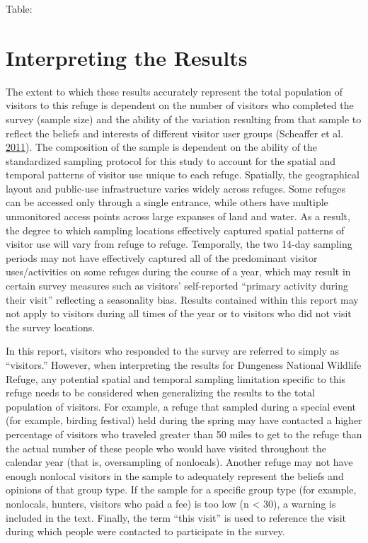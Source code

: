 \documentclass[]{book}
\begin{document}
Table: \label{tab:sampling-dates}

\section{Interpreting the Results}\label{interpreting-the-results}

The extent to which these results accurately represent the total
population of visitors to this refuge is dependent on the number of
visitors who completed the survey (sample size) and the ability of the
variation resulting from that sample to reflect the beliefs and
interests of different visitor user groups (Scheaffer et al.
\protect\hyperlink{ref-scheaffer1996}{2011}). The composition of the
sample is dependent on the ability of the standardized sampling protocol
for this study to account for the spatial and temporal patterns of
visitor use unique to each refuge. Spatially, the geographical layout
and public-use infrastructure varies widely across refuges. Some refuges
can be accessed only through a single entrance, while others have
multiple unmonitored access points across large expanses of land and
water. As a result, the degree to which sampling locations effectively
captured spatial patterns of visitor use will vary from refuge to
refuge. Temporally, the two 14-day sampling periods may not have
effectively captured all of the predominant visitor uses/activities on
some refuges during the course of a year, which may result in certain
survey measures such as visitors' self-reported ``primary activity
during their visit'' reflecting a seasonality bias. Results contained
within this report may not apply to visitors during all times of the
year or to visitors who did not visit the survey locations.

In this report, visitors who responded to the survey are referred to
simply as ``visitors.'' However, when interpreting the results for
Dungeness National Wildlife Refuge, any potential spatial and temporal
sampling limitation specific to this refuge needs to be considered when
generalizing the results to the total population of visitors. For
example, a refuge that sampled during a special event (for example,
birding festival) held during the spring may have contacted a higher
percentage of visitors who traveled greater than 50 miles to get to the
refuge than the actual number of these people who would have visited
throughout the calendar year (that is, oversampling of nonlocals).
Another refuge may not have enough nonlocal visitors in the sample to
adequately represent the beliefs and opinions of that group type. If the
sample for a specific group type (for example, nonlocals, hunters,
visitors who paid a fee) is too low (n \textless{} 30), a warning is
included in the text. Finally, the term ``this visit'' is used to
reference the visit during which people were contacted to participate in
the survey.
\end{document}
